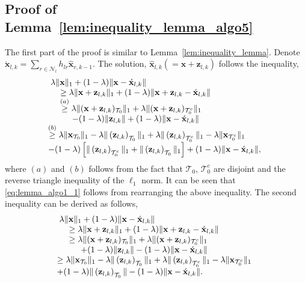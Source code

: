 \documentclass[journal]{IEEEtran}
\newcommand{\mbx}{\mathbf{x}}
\newcommand{\mbz}{\mathbf{z}}
\newcommand{\T}{\mathcal{T}}
\begin{document}
\subsection{Proof of Lemma~\ref{lem:inequality_lemma_algo5}}
The first part of the proof is similar to Lemma~\ref{lem:inequality_lemma}. Denote $\acute{\mbx}_{l,k} = \sum\limits_{r \in \mathcal{N}_l} h_{lr} \hat{\mbx}_{r,k-1}$. The solution, $\hat{\mbx}_{l,k} \left(= \mbx + \mbz_{l,k}\right)$ follows the inequality,
\begin{eqnarray*}
\begin{array}{rl}
&\hspace{-4mm} \lambda \|\mbx\|_1 + (1-\lambda) \|\mbx-\acute{\mbx}_{l,k}\| \\
&\geq \lambda \|\mbx + \mbz_{l,k}\|_1 + (1-\lambda) \|\mbx + \mbz_{l,k} - \acute{\mbx}_{l,k}\| \\
&\stackrel{(a)}{\geq} \lambda \|(\mbx + \mbz_{l,k})_{\T_0}\|_1 + \lambda \|(\mbx + \mbz_{l,k})_{\T_0^c}\|_1 \\ 
& \hspace{5mm} - (1-\lambda) \|\mbz_{l,k} \| + (1-\lambda) \|\mbx  - \acute{\mbx}_{l,k}\| \\
& \hspace{-5mm} \stackrel{(b)}{\geq} \lambda\|\mbx_{\T_0}\|_1 - \lambda\|\left(\mbz_{l,k}\right)_{\T_0}\|_1 + \lambda\|\left(\mbz_{l,k}\right)_{\T_0^c}\|_1 -                 \lambda\|\mbx_{\T_0^c}\|_1 \\
& \hspace{-5mm} - (1-\lambda) \left[\|\left(\mbz_{l,k}\right)_{\T_0^c} \|_1+ \|\left(\mbz_{l,k}\right)_{\T_0} \|_1\right] + (1-\lambda) \|\mbx  - \acute{\mbx}_{l,k}\| ,
\end{array}
\end{eqnarray*}
where $(a)$ and $(b)$ follows from the fact that $\T_0$, $\T_0^c$ are disjoint and the reverse triangle inequality of the $\ell_1$ norm. It can be seen that \eqref{eq:lemma_algo1_1} follows from rearranging the above inequality.
The second inequality can be derived as follows,
\begin{eqnarray*}
\begin{array}{rl}
&\hspace{-4mm} \lambda \|\mbx\|_1 + (1-\lambda) \|\mbx-\acute{\mbx}_{l,k}\| \\
&\geq \lambda \|\mbx + \mbz_{l,k}\|_1 + (1-\lambda) \|\mbx + \mbz_{l,k} - \acute{\mbx}_{l,k}\| \\
&\geq \lambda \|(\mbx + \mbz_{l,k})_{\T_0}\|_1 + \lambda \|(\mbx + \mbz_{l,k})_{\T_0^c}\|_1 \\ 
& \hspace{5mm} + (1-\lambda) \|\mbz_{l,k} \| - (1-\lambda) \|\mbx  - \acute{\mbx}_{l,k}\| \\
& \hspace{-5mm} \geq \lambda\|\mbx_{\T_0}\|_1 - \lambda\|\left(\mbz_{l,k}\right)_{\T_0}\|_1 + \lambda\|\left(\mbz_{l,k}\right)_{\T_0^c}\|_1 -                 \lambda\|\mbx_{\T_0^c}\|_1 \\
& \hspace{-5mm} + (1-\lambda) \|\left(\mbz_{l,k}\right)_{\T_0} \| - (1-\lambda) \|\mbx  - \acute{\mbx}_{l,k}\|.
\end{array}
\end{eqnarray*}
\end{document}
